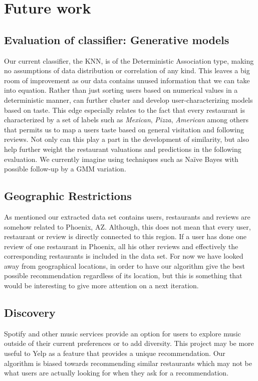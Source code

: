 \documentclass[10pt,twocolumn,letterpaper]{article}
\begin{document}
\section{Future work}

\subsection{Evaluation of classifier: Generative models}
Our current classifier, the KNN, is of the Deterministic Association type, making no assumptions of data distribution or correlation of any kind. This leaves a big room of improvement as our data contains unused information that we can take into equation. Rather than just sorting users based on numerical values in a deterministic manner, can further cluster and develop user-characterizing models based on taste. This edge especially relates to the fact that every restaurant is characterized by a set of labels such as \textit{Mexican}, \textit{Pizza}, \textit{American} among others that permits us to map a users taste based on general visitation and following reviews. Not only can this play a part in the development of similarity, but also help further weight the restaurant valuations and predictions in the following evaluation. We currently imagine using techniques such as Naïve Bayes with possible follow-up by a GMM variation.

\subsection{Geographic Restrictions}
As mentioned our extracted data set contains users, restaurants and reviews are somehow related to Phoenix, AZ. Although, this does not mean that every user, restaurant or review is directly connected to this region. If a user has done one review of one restaurant in Phoenix, all his other reviews and effectively the corresponding restaurants is included in the data set. For now we have looked away from geographical locations, in order to have our algorithm give the best possible recommendation regardless of its location, but this is something that would be interesting to give more attention on a next iteration.

\subsection{Discovery}
Spotify and other music services provide an option for users to explore music outside of their current preferences or to add diversity. This project may be more useful to Yelp as a feature that provides a unique recommendation. Our algorithm is biased towards recommending similar restaurants which may not be what users are actually looking for when they ask for a recommendation.


{\small

}
\end{document}
